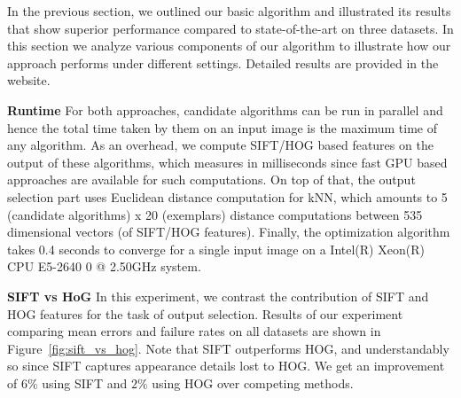 \label{subsec:experimental_analysis}
In the previous section, we outlined our basic algorithm and illustrated its results that
show superior performance compared to state-of-the-art on three datasets. In this section
we analyze various components of our algorithm to illustrate how 
our approach performs under different settings. Detailed results are provided in the website.

\textbf{Runtime} For both approaches, candidate algorithms can be run in parallel and hence
the total time taken by them on an input image is the maximum time of any algorithm. As an overhead,
we compute SIFT/HOG based features on the output of these algorithms, which measures in milliseconds
since fast GPU based approaches are available for such computations. On top of that, the output selection 
part uses Euclidean distance computation for kNN, which amounts to 5 (candidate algorithms) x 20
(exemplars) distance computations between 535 dimensional vectors (of SIFT/HOG features). 
Finally, the optimization algorithm takes 0.4 seconds to converge for a single input image on a 
Intel(R) Xeon(R) CPU E5-2640 0 @ 2.50GHz system.

\textbf{SIFT vs HoG}
\label{subsec:sift_vs_hog_vs_both}
In this experiment, we contrast the contribution of SIFT
and HOG features for the task of output selection. Results of our experiment comparing mean errors
and failure rates on all datasets are shown in Figure~\ref{fig:sift_vs_hog}. Note that
SIFT outperforms HOG, and understandably so since SIFT captures appearance details lost to HOG. 
We get an improvement of $6\%$ using SIFT and $2\%$ using HOG over competing
methods.

